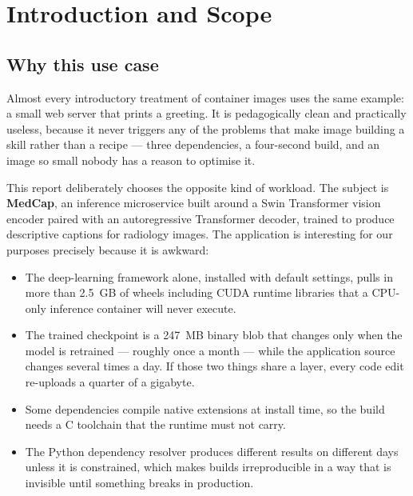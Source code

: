 \documentclass[10pt,a4paper]{article}
\begin{document}
\vspace{8pt}
\tableofcontents

\section{Introduction and Scope}

\subsection{Why this use case}

Almost every introductory treatment of container images uses the same
example: a small web server that prints a greeting. It is pedagogically
clean and practically useless, because it never triggers any of the
problems that make image building a skill rather than a recipe --- three
dependencies, a four-second build, and an image so small nobody has a
reason to optimise it.

This report deliberately chooses the opposite kind of workload. The
subject is \textbf{MedCap}, an inference microservice built around a
Swin Transformer vision encoder paired with an autoregressive Transformer
decoder, trained to produce descriptive captions for radiology images.
The application is interesting for our purposes precisely because it is
awkward:

\begin{itemize}[leftmargin=1.4em,itemsep=2pt]
  \item The deep-learning framework alone, installed with default
        settings, pulls in more than 2.5~GB of wheels including CUDA
        runtime libraries that a CPU-only inference container will
        never execute.
  \item The trained checkpoint is a 247~MB binary blob that changes
        only when the model is retrained --- roughly once a month ---
        while the application source changes several times a day. If
        those two things share a layer, every code edit re-uploads a
        quarter of a gigabyte.
  \item Some dependencies compile native extensions at install time,
        so the build needs a C toolchain that the runtime must not
        carry.
  \item The Python dependency resolver produces different results on
        different days unless it is constrained, which makes builds
        irreproducible in a way that is invisible until something
        breaks in production.
\end{itemize}
\end{document}

